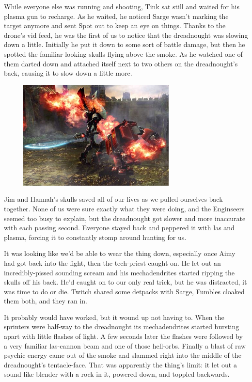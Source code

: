 While everyone else was running and shooting, Tink sat still and waited for his plasma gun to recharge. 
As he waited, he noticed Sarge wasn't marking the target anymore and sent Spot out to keep an eye on things. 
Thanks to the drone's vid feed, he was the first of us to notice that the dreadnought was slowing down a little. 
Initially he put it down to some sort of battle damage, but then he spotted the familiar-looking skulls flying above the smoke. 
As he watched one of them darted down and attached itself next to two others on the dreadnought's back, causing it to slow down a little more.

\begin{figure}
	\begin{center}
		\includegraphics[width=\figwidth]{pics/11/80.png}
	\end{center}
\end{figure}
Jim and Hannah's skulls saved all of our lives as we pulled ourselves back together. 
None of us were sure exactly what they were doing, and the Enginseers seemed too busy to explain, but the dreadnought got slower and more inaccurate with each passing second. 
Everyone stayed back and peppered it with las and plasma, forcing it to constantly stomp around hunting for us. 


It was looking like we'd be able to wear the thing down, especially once Aimy had got back into the fight, then the tech-priest caught on. 
He let out an incredibly-pissed sounding scream and his mechadendrites started ripping the skulls off his back. 
He'd caught on to our only real trick, but he was distracted, it was time to do or die. 
Twitch shared some detpacks with Sarge, Fumbles cloaked them both, and they ran in.

It probably would have worked, but it wound up not having to. 
When the sprinters were half-way to the dreadnought its mechadendrites started bursting apart with little flashes of light. 
A few seconds later the flashes were followed by a very familiar las-cannon beam and one of those hell-orbs. 
Finally a blast of raw psychic energy came out of the smoke and slammed right into the middle of the dreadnought's tentacle-face. 
That was apparently the thing's limit: 
it let out a sound like blender with a rock in it, powered down, and toppled backwards.

